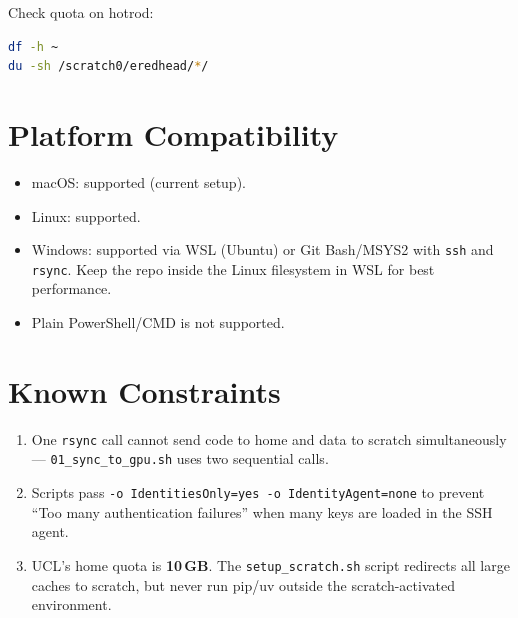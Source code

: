 \documentclass[11pt, a4paper]{article}
\begin{document}
\vspace{0.5em}
Check quota on hotrod:
\begin{lstlisting}[language=bash]
df -h ~
du -sh /scratch0/eredhead/*/
\end{lstlisting}

\section{Platform Compatibility}
\begin{itemize}
    \item macOS: supported (current setup).
    \item Linux: supported.
    \item Windows: supported via WSL (Ubuntu) or Git Bash/MSYS2 with \texttt{ssh} and \texttt{rsync}.
          Keep the repo inside the Linux filesystem in WSL for best performance.
    \item Plain PowerShell/CMD is not supported.
\end{itemize}

\section{Known Constraints}
\begin{enumerate}
    \item One \texttt{rsync} call cannot send code to home and data to scratch simultaneously ---
          \texttt{01\_sync\_to\_gpu.sh} uses two sequential calls.
    \item Scripts pass \texttt{-o IdentitiesOnly=yes -o IdentityAgent=none} to prevent
          ``Too many authentication failures'' when many keys are loaded in the SSH agent.
    \item UCL's home quota is \textbf{10\,GB}. The \texttt{setup\_scratch.sh} script
          redirects all large caches to scratch, but never run pip/uv outside the
          scratch-activated environment.
\end{enumerate}
\end{document}
